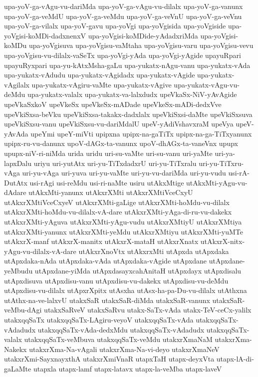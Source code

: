 {upa-yoV-ga-vAgu-vu-dariMda
upa-yoV-ga-vAgu-vu-dilalx
upa-yoV-ga-vanunx
upa-yoV-ga-veMdU
upa-yoV-ga-veMdu
upa-yoV-ga-veVnU
upa-yoV-ga-veVnu
upa-yoV-ga-vilalx
upa-yoV-gavu
upa-yoVgi
upa-yoVgisida
upa-yoVgiside
upa-yoVgisi-koMDi-dadxnenxV
upa-yoVgisi-koMDide-yAdadxriMda
upa-yoVgisi-koMDu
upa-yoVgisuva
upa-yoVgisu-vaMtaha
upa-yoVgisu-varu
upa-yoVgisu-vevu
upa-yoVgisu-vu-dilalx-vaSeTx
upa-yoVgi-yAda
upa-yoVgi-yAgide
upayuRpari
upayuRyxpari
upa-yu-kAtxMsha-gaLu
upa-yukatx-nAgu-vanu
upa-yukatx-vAda
upa-yukatx-vAdudu
upa-yukatx-vAgidadx
upa-yukatx-vAgide
upa-yukatx-vAgilalx
upa-yukatx-vAgiru-vaMte
upa-yukatx-vAgive
upa-yukatx-vAgu-vu-deMdu
upa-yukatx-valalx
upa-yukatx-va-lalxdudx
upeVkaSx-NiV-yAvAgide
upeVkaSxkoV
upeVkeSx
upeVkeSx-mADade
upeVkeSx-mADi-dedxVve
upeVkiSxsa-beVku
upeVkiSxsa-takakx-dadxlalx
upeVkiSxsi-daMte
upeVkiSxsuva
upeVkiSxsu-vanu
upeVkiSxsu-vu-dariMdalU
upeV-yAdiVshavxraM
upeVya
upeV-yAvAda
upeYmi
upeY-miVti
upipxna
upipx-na-gaTiTx
upipx-na-ga-TiTxyanunx
upipx-ru-vu-danunx
upoV-dAGx-ta-vanunx
upoV-dhAGx-ta-vaneVnx
upupx
upupx-niV-ri-niMda
urida
uridu
uri-su-vaMte
uri-su-vanu
uri-yaMte
uri-ya-lapxDalu
uriyu
uri-yutAtx
uri-yu-TiTxdadxrU
uri-yu-TiTxralu
uri-yu-TiTxru-vAga
uri-yu-vAga
uri-yuva
uri-yu-vaMte
uri-yu-vu-dariMda
uri-yu-vudu
usi-rA-DutAtx
usi-rAgi
usi-reMdu
usi-ri-naMte
usiru
utAkxMtige
utAkxMti-yAgu-vu-dAdare
utAkxMti-yanunx
utAkxrXMti
utAkxrXMtiVceCxyU
utAkxrXMtiVceCxyeV
utAkxrXMti-gaLige
utAkxrXMti-hoMdu-vu-dilalx
utAkxrXMti-hoMdu-vu-dilalx-vA-dare
utAkxrXMti-yAga-di-ru-vu-dakekx
utAkxrXMti-yAguva
utAkxrXMti-yAgu-vudu
utAkxrXMtiyU
utAkxrXMtiya
utAkxrXMti-yanunx
utAkxrXMti-yeMdu
utAkxrXMtiyu
utAkxrXMti-yuMTe
utAkxrX-manf
utAkxrX-manitx
utAkxrX-mataH
utAkxrXnatx
utAkxrX-nitx-yAgu-vu-dilalx-vA-dare
utAkxrXnoVtx
utAkxrxMti
utApxda
utApxdaka
utApxdaka-nAda
utApxdaka-vAda
utApxdaka-vAgide
utApxdane
utApxdane-yeMbudu
utApxdane-yiMda
utApxdasayxcahAnitaH
utApxdayx
utApxdisalu
utApxdisuva
utApxdisu-vanu
utApxdisu-vu-dakekx
utApxdisu-vu-deMdu
utApxdisu-vu-dilalx
utApxrXpitx
utAsxha
utAsx-ha-pa-Du-vu-dilalx
utAthxna
utAthx-na-ve-lalxvU
utakxSaR
utakxSaR-diMda
utakxSaR-vanunx
utakxSaR-veMbu-dAgi
utakxSaRveV
utakxSaRvu
utakx-SaTx-vAda
utakx-TeV-ceCx-yalilx
utakxqqSaTx
utakxqqSaTx-LAgiru-veyoV
utakxqqSaTx-vAda
utakxqqSaTx-vAdadudx
utakxqqSaTx-vAda-dedxMdu
utakxqqSaTx-vAdadudx
utakxqqSaTx-valalx
utakxqqSaTx-veMbuva
utakxqqSaTx-veMdu
utakxrXmaNaM
utakxrXma-Nakekx
utakxrXma-Na-vAgali
utakxrXma-Na-vi-deyo
utakxrXmaNeV
utakxrXmi-SayxnayxthA
utakxrXmiVnaR
utapxTaH
utapx-deyxVta
utapx-lA-di-gaLaMte
utapxla
utapx-lamf
utapx-latavx
utapx-la-veMba
utapx-laveV
}
